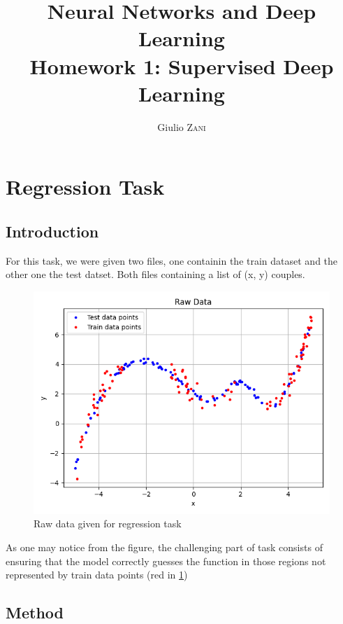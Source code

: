 \documentclass{article}
\title{Neural Networks and Deep Learning \\ Homework 1: Supervised Deep Learning}
\author{Giulio \textsc{Zani}} %
\begin{document}
\maketitle %


\tableofcontents


\section{Regression Task}
\subsection{Introduction}
For this task, we were given two files, one containin the train dataset and the other one the test datset. Both files containing a list of (x, y) couples. 
\begin{figure}[H]
  \begin{center}
    \includegraphics[width=\linewidth]{regression_task/imgs/raw_data.png}
    \caption{Raw data given for regression task}\label{raw_data}
  \end{center}
\end{figure}


As one may notice from the figure, the challenging part of task consists of ensuring that the model correctly guesses the function in those regions not represented by train data points 
(red in \figurename{\ref{raw_data}})

\subsection{Method}
\end{document}

